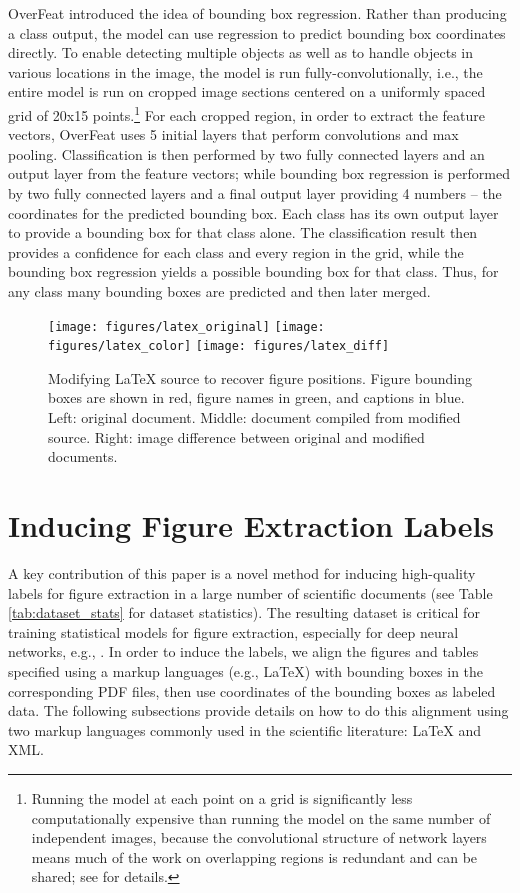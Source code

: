 \documentclass[sigconf]{acmart}
\begin{document}
OverFeat \cite{overfeat} introduced the idea of bounding box regression. 
Rather than producing a class output, the model can use regression to predict bounding box coordinates directly. To enable detecting multiple objects as well as to handle objects in various locations in the image, the model is run fully-convolutionally, i.e., the entire model is run on cropped image sections centered on a uniformly spaced grid of 20x15 points.\footnote{Running the model at each point on a grid is significantly less computationally expensive than running the model on the same number of independent images, because the convolutional structure of network layers means much of the work on overlapping regions is redundant and can be shared; see \cite{overfeat} for details.}
For each cropped region, in order to extract the feature vectors, OverFeat uses 5 initial layers that perform convolutions and max pooling. Classification is then performed by two fully connected layers and an output layer from the feature vectors; while bounding box regression is performed by two fully connected layers and a final output layer providing 4 numbers -- the coordinates for the predicted bounding box. Each class has its own output layer to provide a bounding box for that class alone. The classification result then provides a confidence for each class and every region in the grid, while the bounding box regression yields a possible bounding box for that class. Thus, for any class many bounding boxes are predicted and then later merged.

\begin{figure*}
\texttt{[image: figures/latex\_original]}
\texttt{[image: figures/latex\_color]}
\texttt{[image: figures/latex\_diff]}
\caption{Modifying LaTeX source to recover figure positions. Figure bounding boxes are shown in red, figure names in green, and captions in blue. Left: original document. Middle: document compiled from modified source. Right: image difference between original and modified documents.}
\label{fig:latex}
\end{figure*}\section{Inducing Figure Extraction Labels}\label{data}A key contribution of this paper is a novel method for inducing high-quality labels for figure extraction in a large number of scientific documents (see Table \ref{tab:dataset_stats} for dataset statistics).
The resulting dataset is critical for training statistical models for figure extraction, especially  for deep neural networks, e.g., \cite{resnet}.
In order to induce the labels, we align the figures and tables specified using a markup languages (e.g., LaTeX) with bounding boxes in the corresponding PDF files, then use coordinates of the bounding boxes as labeled data.
The following subsections provide details on how to do this alignment using two markup languages commonly used in the scientific literature: LaTeX and XML.
\end{document}
